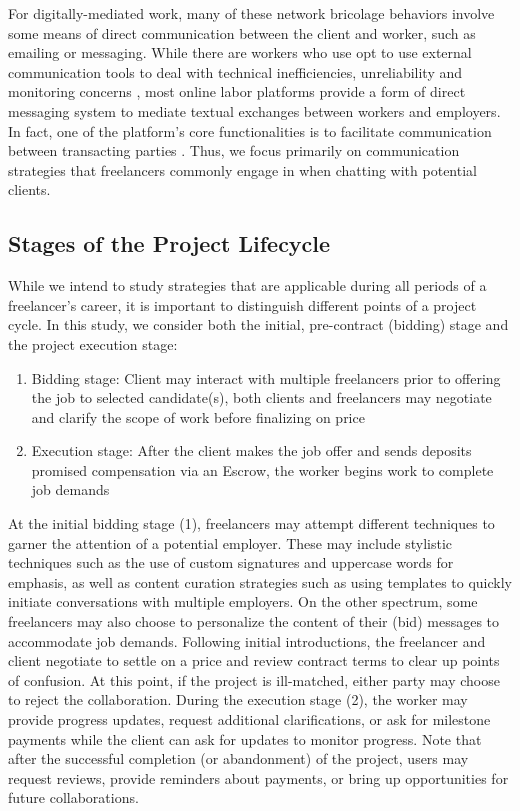 {For digitally-mediated work, many} of these network bricolage behaviors involve some means of direct communication between the client and worker, such as emailing or messaging. {While there are workers who use opt to use external communication tools to deal with technical inefficiencies, unreliability and monitoring concerns \cite{platform_manage, Jarrahi_Sutherland_2019}, } most online labor platforms provide a form of direct messaging system to mediate textual exchanges between workers and employers{. In fact, one of the platform's core functionalities is to facilitate communication between transacting parties \cite{platform_manage}.} {Thus, we focus} primarily on communication strategies that freelancers commonly engage in when {chatting with} potential clients. 

\subsection{{Stages of the Project Lifecycle}}

While we intend to study strategies that are applicable during all periods of a freelancer's career, it is important to {distinguish} different points of a project cycle. In this study, we consider both the initial, pre-contract (bidding) stage and the project execution stage: 

\begin{enumerate}
    \item Bidding stage: Client may interact with multiple freelancers prior to offering the job to selected candidate(s), both clients and freelancers may negotiate and clarify the scope of work before finalizing on price
    \item Execution stage: After the client makes the job offer and sends deposits promised compensation via an Escrow, the worker begins work to complete job demands 
\end{enumerate}

At the initial bidding stage (1), freelancers may attempt different techniques to garner the attention of a potential employer. These may include stylistic techniques such as the use of custom signatures and uppercase words for emphasis, as well as content curation strategies such as using templates to quickly initiate conversations with multiple employers. On the other spectrum, some freelancers may also choose to personalize the content of their (bid) messages to accommodate job demands. Following initial introductions, the freelancer and client negotiate to settle {on a} price and review contract terms to clear up points of confusion. At this point, if the project is ill-matched, either party may choose to reject the collaboration. During the execution stage (2), the worker may provide progress updates, request additional clarifications, or ask for milestone payments while the client can ask for updates to monitor progress. Note that after the successful completion (or abandonment) of the project, users may request reviews, provide reminders about payments, or bring up opportunities for future collaborations. 

